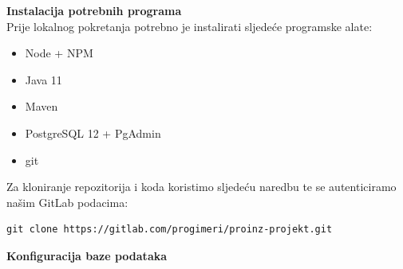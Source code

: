 \hfill \break
\textbf{Instalacija potrebnih programa}\\
Prije lokalnog pokretanja potrebno je instalirati sljedeće programske alate:
\begin{itemize}
	\item Node + NPM
	\item Java 11
	\item Maven
	\item PostgreSQL 12 + PgAdmin
	\item git
\end{itemize}

Za kloniranje repozitorija i koda koristimo sljedeću naredbu te se autenticiramo našim GitLab podacima:
\begin{lstlisting}[]
git clone https://gitlab.com/progimeri/proinz-projekt.git
\end{lstlisting}
\hfill \break
\hfill \break
\textbf{Konfiguracija baze podataka}\\


